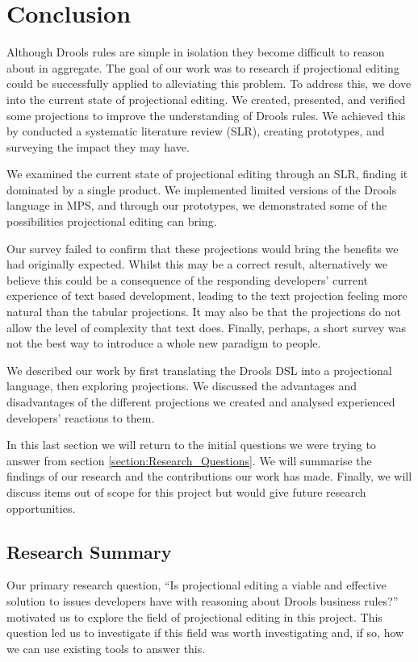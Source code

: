 \chapter{Conclusion}
\label{chapter:Conclusion}

Although Drools rules are simple in isolation they become difficult to reason about in aggregate.
The goal of our work was to research if projectional editing could be successfully applied to alleviating this problem.
To address this, we dove into the current state of projectional editing.
We created, presented, and verified some projections to improve the understanding of Drools rules.
We achieved this by conducted a systematic literature review (SLR), creating prototypes, and surveying the impact they may have.

We examined the current state of projectional editing through an SLR, finding it dominated by a single product.
We implemented limited versions of the Drools language in MPS, and through our prototypes, we demonstrated some of the possibilities projectional editing can bring.

Our survey failed to confirm that these projections would bring the benefits we had originally expected.
Whilst this may be a correct result, alternatively we believe this could be a consequence of the responding developers' current experience of text based development, leading to the text projection feeling more natural than the tabular projections.
It may also be that the projections do not allow the level of complexity that text does.
Finally, perhaps, a short survey was not the best way to introduce a whole new paradigm to people.  

We described our work by first translating the Drools DSL into a projectional language, then exploring projections.
We discussed the advantages and disadvantages of the different projections we created and analysed experienced developers' reactions to them.

In this last section we will return to the initial questions we were trying to answer from section \ref{section:Research_Questions}.
We will summarise the findings of our research and the contributions our work has made.
Finally, we will discuss items out of scope for this project but would give future research opportunities.

\section{Research Summary}
Our primary research question, ``Is projectional editing a viable and effective solution to issues developers have with reasoning about Drools business rules?'' motivated us to explore the field of projectional editing in this project.
This question led us to investigate if this field was worth investigating and, if so, how we can use existing tools to answer this.

